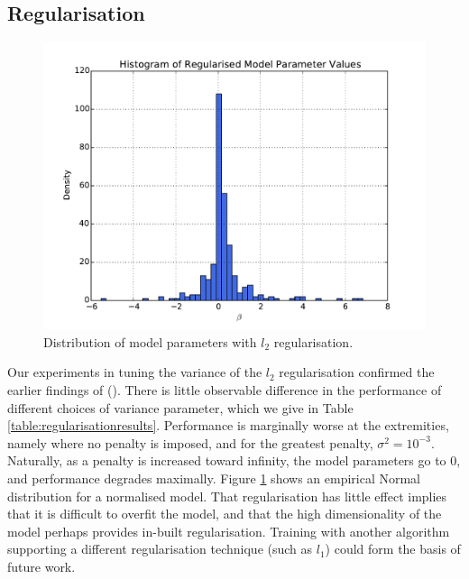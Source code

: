 \subsection{Regularisation}

\begin{figure}[h]
\center
\includegraphics[width=5.5in]{Figures/histogram.pdf}
\caption{Distribution of model parameters with $l_2$ regularisation.}
\label{fig:histogram}
\end{figure}

Our experiments in tuning the variance of the $l_2$ regularisation confirmed the earlier findings of (\cite{Peng04accurateinformation}). There is little observable difference in the performance of different choices of variance parameter, which we give in Table \ref{table:regularisationresults}. Performance is marginally worse at the extremities, namely where no penalty is imposed, and for the greatest penalty, $\sigma^2 = 10^{-3}$. Naturally, as a penalty is increased toward infinity, the model parameters go to 0, and performance degrades maximally. Figure \ref{fig:histogram} shows an empirical Normal distribution for a normalised model. That regularisation has little effect implies that it is difficult to overfit the model, and that the high dimensionality of the model perhaps provides in-built regularisation. Training with another algorithm supporting a different regularisation technique (such as $l_1$) could form the basis of future work.

